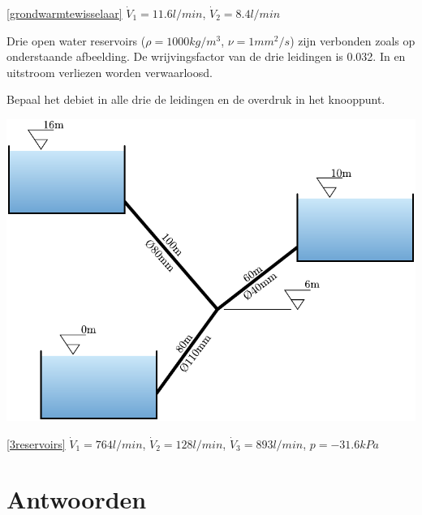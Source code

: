 \begin{antwoord}{\ref{grondwarmtewisselaar}}
	$\dot{V}_{1} = 11.6\unit{l/min}$, $\dot{V}_{2} = 8.4\unit{l/min}$
\end{antwoord}
\begin{toepassing}[*]
	\label{3reservoirs}
Drie open water reservoirs ($\rho=1000\unit{kg/m^3}$, $\nu=1\unit{mm^2/s}$) zijn verbonden zoals op onderstaande afbeelding. De wrijvingsfactor van de drie leidingen is 0.032. In en uitstroom verliezen worden verwaarloosd.
		
Bepaal het debiet in alle drie de leidingen en de overdruk in het knooppunt.
		
	\centering
	\includegraphics{fig/leidingstelsels/3reservoirs}
\end{toepassing}
\begin{antwoord}{\ref{3reservoirs}}
		$\dot{V}_1 = 764\unit{l/min}$, $\dot{V}_2 = 128\unit{l/min}$, $\dot{V}_3 = 893\unit{l/min}$, $p=-31.6\unit{kPa}$
\end{antwoord}
\section*{Antwoorden}
	\begin{multicols}{2}
	\end{multicols}